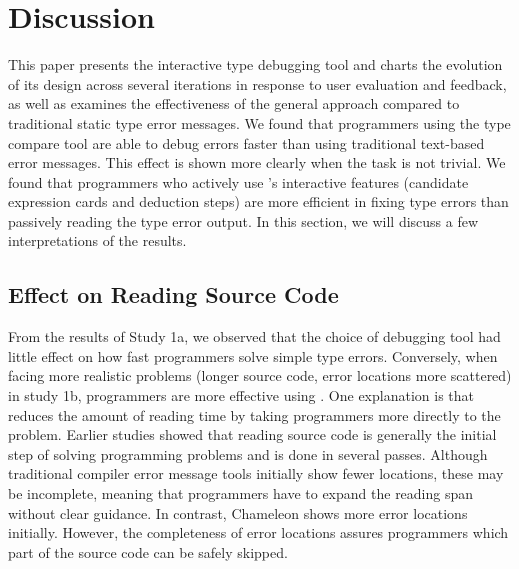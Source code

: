 \section{Discussion}


This paper presents the interactive type debugging tool \chameleon{} and charts the evolution of its design across several iterations in response to user evaluation and feedback, as well as examines   the effectiveness of the general approach compared to traditional static type error messages. We found that programmers using the \chameleon{} type compare tool are able to debug errors faster than using traditional text-based error messages. This effect is shown more clearly when the task is not trivial. We found that programmers who actively use \chameleon{}'s interactive features (candidate expression cards and deduction steps) are more efficient in fixing type errors than passively reading the type error output. In this section, we will discuss a few interpretations of the results.


\subsection{Effect on Reading Source Code}
From the results of Study 1a, we observed that the choice of debugging tool had little effect on how fast programmers solve simple type errors. Conversely, when facing more realistic problems (longer source code, error locations more scattered) in study 1b, programmers are more effective using \chameleon{}. One explanation is that \chameleon{} reduces the amount of reading time by taking programmers more directly to the problem. Earlier studies \cite{jbara_how_2015, peitek_what_2020} showed that reading source code is generally the initial step of solving programming problems and is done in several passes. Although traditional compiler error message tools initially show fewer locations, these may be incomplete, meaning that programmers have to expand the reading span without clear guidance. In contrast, Chameleon shows more error locations initially. However, the completeness of error locations assures programmers which part of the source code can be safely skipped.

